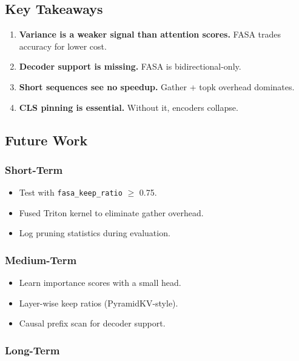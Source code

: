 \subsection{Key Takeaways}

\begin{enumerate}
\item \textbf{Variance is a weaker signal than attention scores.} FASA trades
  accuracy for lower cost.
\item \textbf{Decoder support is missing.} FASA is bidirectional-only.
\item \textbf{Short sequences see no speedup.} Gather + topk overhead dominates.
\item \textbf{CLS pinning is essential.} Without it, encoders collapse.

\end{enumerate}
\subsection{Future Work}

\subsubsection{Short-Term}

\begin{itemize}
\item Test with \texttt{fasa\_keep\_ratio} $\ge$ 0.75.
\item Fused Triton kernel to eliminate gather overhead.
\item Log pruning statistics during evaluation.

\end{itemize}
\subsubsection{Medium-Term}

\begin{itemize}
\item Learn importance scores with a small head.
\item Layer-wise keep ratios (PyramidKV-style).
\item Causal prefix scan for decoder support.

\end{itemize}
\subsubsection{Long-Term}

